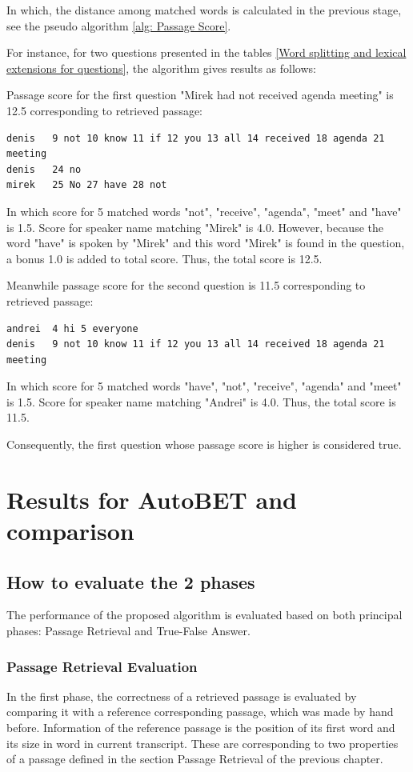 \documentclass[10pt,a4paper]{article}
\numberwithin{algorithm}{section}  %
\begin{document}
In which, the distance among matched words is calculated in the previous stage, see the pseudo algorithm \ref{alg: Passage Score}.



For instance, for two questions presented in the tables \ref{Word splitting and lexical extensions for questions}, the algorithm gives results as follows: 

Passage score for the first question "Mirek had not received agenda meeting" is 12.5 corresponding to retrieved passage:
\scriptsize
\begin{verbatim}
denis   9 not 10 know 11 if 12 you 13 all 14 received 18 agenda 21 meeting
denis   24 no 
mirek   25 No 27 have 28 not
\end{verbatim}
\normalsize
 In which score for 5 matched words "not", "receive", "agenda", "meet" and "have" is 1.5. Score for speaker name matching "Mirek" is 4.0. However, because the word "have" is spoken by "Mirek" and this word "Mirek" is found in the question, a bonus 1.0 is added to total score. Thus, the total score is 12.5.

Meanwhile passage score for the second question is 11.5 corresponding to retrieved passage:
\scriptsize
\begin{verbatim}
andrei  4 hi 5 everyone 
denis   9 not 10 know 11 if 12 you 13 all 14 received 18 agenda 21 meeting
\end{verbatim}
\normalsize
In which score for 5 matched words "have", "not", "receive", "agenda" and "meet" is 1.5. Score for speaker name matching "Andrei" is 4.0. Thus, the total score is 11.5.

Consequently, the first question whose passage score is higher is considered true.


\section{Results for AutoBET and comparison}

\subsection{How to evaluate the 2 phases}
The performance of the proposed algorithm is evaluated based on both principal phases: Passage Retrieval and True-False Answer. 

\subsubsection*{Passage Retrieval Evaluation}
In the first phase, the correctness of a retrieved passage is evaluated by comparing it with a reference corresponding passage, which was made by hand before. Information of the reference passage is the position of its first word and its size in word in current transcript. These are corresponding to two properties of a passage defined in the section Passage Retrieval of the previous chapter. 
\end{document}
